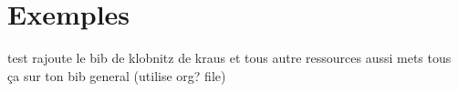 \chapter{Exemples}
test \cite{Kachigar2018}
rajoute le bib de klobnitz de kraus et tous autre ressources aussi mets tous ça sur ton bib
general (utilise org? file)
